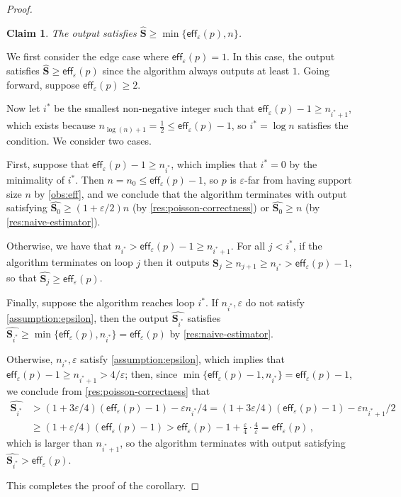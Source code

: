 \documentclass[10pt,a4paper]{article}
\newtheorem{claim}{Claim}[section]
\newcommand{\eff}{\mathsf{eff}}
\renewcommand{\epsilon}{\varepsilon}
\begin{document}
\begin{proof}
\begin{claim}
    The output satisfies $\widehat{\bm{S}} \ge \min\{\eff_\epsilon(p), n\}$.
\end{claim}
\begin{subproof}
    We first consider the edge case where $\eff_\epsilon(p) = 1$. In this case, the output satisfies
    $\widehat{\bm{S}} \ge \eff_\epsilon(p)$ since the algorithm always outputs at least
    $1$. Going forward, suppose $\eff_\epsilon(p) \ge 2$.

    Now let $i^*$ be the smallest non-negative integer such that $\eff_\epsilon(p)-1 \geq
    n_{i^*+1}$, which exists because $n_{\log(n)+1} = \frac{1}{2} \le \eff_\epsilon(p)-1$, so $i^* =
    \log n$ satisfies the condition. We consider two cases.

    First, suppose that $\eff_\epsilon(p)-1 \ge n_{i^*}$, which implies that $i^* = 0$ by the
    minimality of $i^*$. Then $n = n_0 \le \eff_\epsilon(p)-1$, so $p$ is $\epsilon$-far from having
    support size $n$ by \cref{obs:eff}, and we conclude that the algorithm terminates with output
    satisfying $\widehat{\bm{S}_0} \ge (1+\epsilon/2) n$ (by \cref{res:poisson-correctness}) or
    $\widehat{\bm{S}_0} \ge n$ (by \cref{res:naive-estimator}).

    Otherwise, we have that $n_{i^*} > \eff_\epsilon(p)-1 \geq n_{i^*+1}$. For all $j < i^*$, if the
    algorithm terminates on loop $j$ then it outputs $\widehat{\bm{S}_j} \geq n_{j+1} \geq n_{i^*} >
    \eff_\epsilon(p)-1$, so that $\widehat{\bm{S}_j} \ge \eff_\epsilon(p)$.

    Finally, suppose the algorithm reaches loop $i^*$. If $n_{i^*}, \epsilon$ do not satisfy
    \cref{assumption:epsilon}, then the output $\widehat{\bm{S}_{i^*}}$ satisfies
    $\widehat{\bm{S}_{i^*}} \ge \min\{\eff_\epsilon(p), n_{i^*}\} = \eff_\epsilon(p)$ by
    \cref{res:naive-estimator}.

    Otherwise, $n_{i^*}, \epsilon$ satisfy \cref{assumption:epsilon}, which implies that
    $\eff_\epsilon(p)-1 \ge n_{i^*+1} > 4/\epsilon$; then, since $\min\{\eff_\epsilon(p)-1,
    n_{i^*}\} = \eff_\epsilon(p)-1$, we conclude from \cref{res:poisson-correctness} that
    \begin{align*}
      \widehat{\bm{S}_{i^*}}
      &> (1+3\epsilon/4) (\eff_\epsilon(p)-1) - \epsilon n_{i^*}/4
      = (1+3\epsilon/4) (\eff_\epsilon(p)-1) - \epsilon n_{i^*+1} / 2 \\
      &\geq (1+\epsilon/4) (\eff_\epsilon(p)-1)
      > \eff_\epsilon(p) - 1 + \frac{\epsilon}{4} \cdot \frac{4}{\epsilon}
      = \eff_\epsilon(p) \,,
    \end{align*}
    which is larger than $n_{i^*+1}$, so the algorithm terminates with output satisfying
    $\widehat{\bm{S}_{i^*}} > \eff_\epsilon(p)$.
\end{subproof}

This completes the proof of the corollary.
\end{proof}
\end{document}

